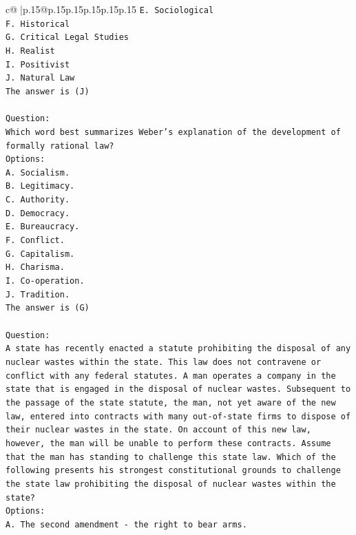\documentclass{article}
\begin{document}
{\begin{supertabular}{c@{$\;$}|p{.15\linewidth}@{}p{.15\linewidth}p{.15\linewidth}p{.15\linewidth}p{.15\linewidth}p{.15\linewidth}}
{{{\texttt{E. Sociological} \\
\texttt{F. Historical} \\
\texttt{G. Critical Legal Studies} \\
\texttt{H. Realist} \\
\texttt{I. Positivist} \\
\texttt{J. Natural Law} \\
\texttt{The answer is (J)} \\
\\ 
\texttt{Question:} \\
\texttt{Which word best summarizes Weber's explanation of the development of formally rational law?} \\
\texttt{Options:} \\
\texttt{A. Socialism.} \\
\texttt{B. Legitimacy.} \\
\texttt{C. Authority.} \\
\texttt{D. Democracy.} \\
\texttt{E. Bureaucracy.} \\
\texttt{F. Conflict.} \\
\texttt{G. Capitalism.} \\
\texttt{H. Charisma.} \\
\texttt{I. Co{-}operation.} \\
\texttt{J. Tradition.} \\
\texttt{The answer is (G)} \\
\\ 
\texttt{Question:} \\
\texttt{A state has recently enacted a statute prohibiting the disposal of any nuclear wastes within the state. This law does not contravene or conflict with any federal statutes. A man operates a company in the state that is engaged in the disposal of nuclear wastes. Subsequent to the passage of the state statute, the man, not yet aware of the new law, entered into contracts with many out{-}of{-}state firms to dispose of their nuclear wastes in the state. On account of this new law, however, the man will be unable to perform these contracts. Assume that the man has standing to challenge this state law. Which of the following presents his strongest constitutional grounds to challenge the state law prohibiting the disposal of nuclear wastes within the state?} \\
\texttt{Options:} \\
\texttt{A. The second amendment {-} the right to bear arms.} \\
}}}
\end{supertabular}}
\end{document}

